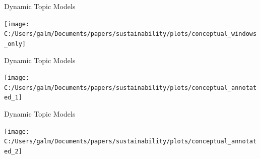 \documentclass[9pt]{beamer}
\begin{document}
\begin{frame}[t]{Dynamic Topic Models}

\texttt{[image: C:/Users/galm/Documents/papers/sustainability/plots/conceptual\_windows\_only]}

\end{frame}

\begin{frame}[t]{Dynamic Topic Models}

\texttt{[image: C:/Users/galm/Documents/papers/sustainability/plots/conceptual\_annotated\_1]}

\end{frame}

\begin{frame}[t]{Dynamic Topic Models}

\texttt{[image: C:/Users/galm/Documents/papers/sustainability/plots/conceptual\_annotated\_2]}

\end{frame}
\end{document}
